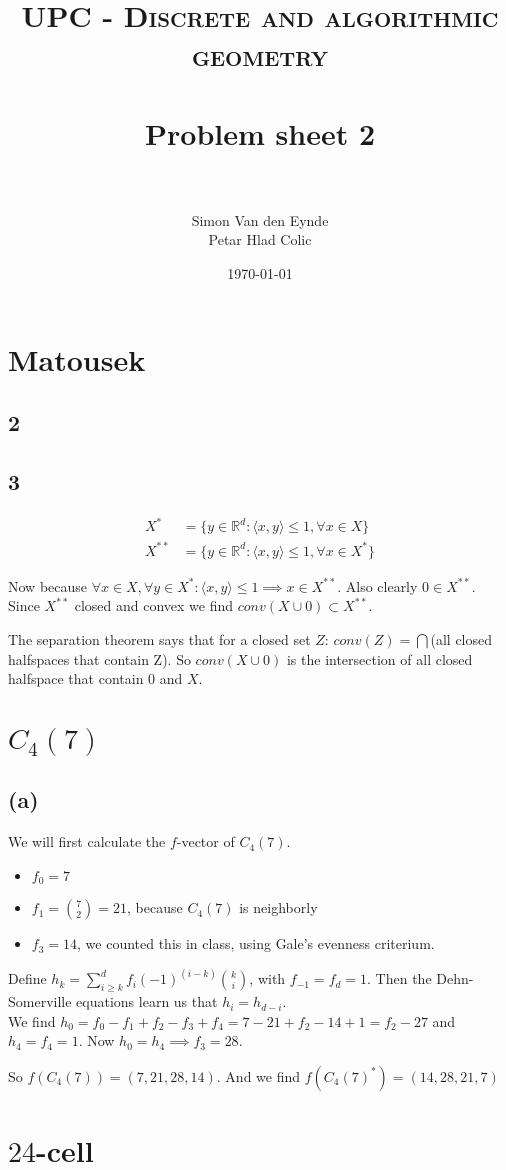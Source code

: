 \documentclass[paper=a4, fontsize=11pt]{scrartcl} %
\title{	
\normalfont \normalsize 
\textsc{UPC - Discrete and algorithmic geometry} \\ [25pt] %
\horrule{0.5pt} \\[0.4cm] %
\huge Problem sheet 2  \\ %
\horrule{2pt} \\[0.5cm] %
}
\author{Simon Van den Eynde \\ Petar Hlad Colic} %
\date{\normalsize\today} %
\theoremstyle{plain}
\begin{document}
\maketitle %

\section{Matousek}
\subsection{2}
\subsection{3}
\begin{align*}
X^{*} &= \{y\in \mathbb{R}^{d} : \langle x,y\rangle \leq 1, \forall x \in X\}\\
X^{**} &= \{y\in \mathbb{R}^{d} : \langle x,y\rangle \leq 1, \forall x \in X^{*}\}
\end{align*}
 
Now because $\forall x\in X,\forall y \in X^{*} : \langle x,y\rangle \leq 1 \implies x\in X^{**}$. Also clearly $0\in X^{**}$. Since $X^{**}$ closed and convex we find $conv(X\cup 0)\subset X^{**}$.

The separation theorem says that for a closed set $Z$: $conv(Z)=\bigcap$(all closed halfspaces that contain Z).
So $conv(X\cup 0)$ is the intersection of all closed halfspace that contain $0$ and $X$.

\section{$C_4(7)$}
\subsection{(a)}
We will first calculate the $f$-vector of $C_4(7)$.
\begin{itemize}
\item $f_0=7$
\item $f_1= \binom{7}{2} = 21$, because $C_4(7)$ is neighborly
\item $f_3 = 14$, we counted this in class, using Gale's evenness criterium.
\end{itemize}

Define $h_k = \sum_{i\geq k}^{d} f_{i}(-1)^{(i-k)}\binom{k}{i} $, with $f_{-1}=f_{d}=1$. Then the Dehn-Somerville equations learn us that $h_i=h_{d-i}$.\\
We find $h_0=f_0-f_1+f_2-f_3+f_4=7-21+f_2-14+1=f_2-27$ and $h_4=f_4=1$. Now $h_0=h_4\implies f_3=28$.

So $f(C_4(7))=(7,21,28,14)$. And we find $f(C_4(7)^*)=(14,28,21,7)$
\section{$24$-cell}
\end{document}
